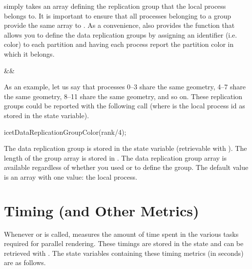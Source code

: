  simply takes an array defining the
replication group that the local process belongs to.  It is important to
ensure that all processes belonging to a group provide the same array to
.  As a convenience, \IceT also provides
the  function that allows you to
define the data replication groups by assigning an identifier (i.e. color)
to each partition and having each process report the partition color in
which it belongs.
\begin{Table}{3}
  \textC{(}&&\quad\textC{);}
\end{Table}

As an example, let us say that processes 0--3 share the same geometry, 4--7
share the same geometry, 8--11 share the same geometry, and so on.  These
replication groups could be reported with the following call (where
 is the local process id as stored in the 
state variable).
\begin{code}
  icetDataReplicationGroupColor(rank/4);
\end{code}

The data replication group is stored in the
 state variable (retrievable with
).  The length of the group array is stored in
.  The data replication group
array is available regardless of whether you used
 or 
to define the group.  The default value is an array with one value: the
local process.


\section{Timing (and Other Metrics)}
\label{sec:Customizing_Compositing:Timing}

Whenever  or  is called, \IceT
measures the amount of time spent in the various tasks required for
parallel rendering.  These timings are stored in the \IceT state and can be
retrieved with .  The state variables containing these
timing metrics (in seconds) are as follows.

